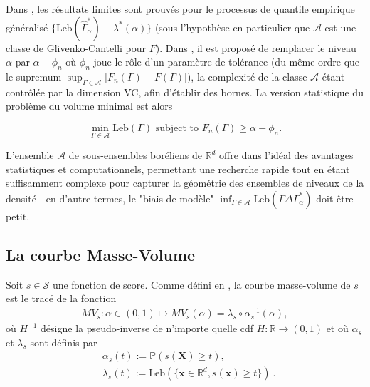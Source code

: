 \documentclass[a4paper, 12pt]{article}
\def\mb{\mathbf}
\def\rset{\mathbb{R}}
\def\leb{\text{Leb}}
\begin{document}
Dans \cite{Polonik97}, les résultats limites sont prouvés pour le processus de quantile empirique généralisé $ \{\leb (\widehat {\Gamma}^*_{\alpha}) - \lambda^*(\alpha) \} $ (sous l'hypothèse en particulier que $ \mathcal{A} $ est une classe de Glivenko-Cantelli pour $ F $). Dans \cite {Scott2006}, il est proposé de remplacer le niveau $\alpha $ par $ \alpha- \phi_n $ où $ \phi_n $ joue le rôle d'un paramètre de tolérance (du même ordre que le supremum $\sup_{\Gamma\in \mathcal{A}}\vert F_n(\Gamma)-F(\Gamma) \vert$), la complexité de la classe $ \mathcal{A} $ étant contrôlée par la dimension {\sc VC}, afin d'établir des bornes. La version statistique du problème du volume minimal est alors

$$
\min_{\Gamma \in \mathcal{A}} \leb(\Gamma) \mbox{ subject to } F_n (\Gamma) \ge \alpha - \phi_n.
$$

L'ensemble $ \mathcal {A} $ de sous-ensembles boréliens de $ \rset^d $ offre dans l'idéal des avantages statistiques et computationnels, permettant une recherche rapide tout en étant suffisamment complexe pour capturer la géométrie des ensembles de niveaux de la densité - en d'autre termes, le "biais de modèle" $ \inf_ {\Gamma \in \mathcal{A}} \leb (\Gamma \Delta \Gamma^*_\alpha) $ doit être petit.


\subsection{La courbe Masse-Volume}
\label{resume_fr:mv-curve}

Soit $s\in \mathcal{S}$ une fonction de score. Comme défini en \cite{CLEM13,CLEM14}, la courbe masse-volume de $s$ est le tracé de la fonction
\begin{align*}
MV_s : \alpha\in (0,1)\mapsto MV_s(\alpha) = \lambda_s \circ \alpha_s^{-1}(\alpha),
\end{align*}
où $ H ^ {- 1} $ désigne la pseudo-inverse de n'importe quelle cdf $H: \mathbb {R} \rightarrow (0,1) $ et où $ \alpha_s $ et $ \lambda_s $ sont définis par
\begin{equation}
\begin{aligned}
\label{resume_fr:eq:alpha_beta}
&\alpha_s(t):= \mathbb{P}(s(\mb X) \ge t), \\
&\lambda_s(t):=\leb(\{\mb x \in \rset^d, s(\mb x) \ge t\})~.
\end{aligned}
\end{equation}
%
\end{document}
